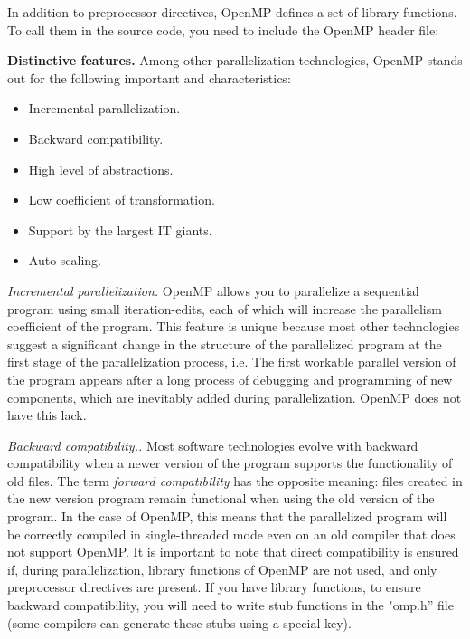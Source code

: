 {\begin{table}[H]
	\end{table}
	\par In addition to preprocessor directives, OpenMP defines a set of library functions. To call them in the source code, you need to include the OpenMP header file:
	\begin{figure}[H]
		
	\end{figure}
	\par\textbf{Distinctive features.} Among other parallelization technologies, OpenMP stands out for the following important and characteristics:
	\begin{itemize}
		\item Incremental parallelization.
		\item Backward compatibility.
		\item High level of abstractions.
		\item Low coefficient of transformation.
		\item Support by the largest IT giants.
		\item Auto scaling.
	\end{itemize}
	\par\textit{Incremental parallelization.} OpenMP allows you to parallelize a sequential program using small iteration-edits, each of which will increase the parallelism coefficient of the program. This feature is unique because most other technologies suggest a significant change in the structure of the parallelized program at the first stage of the parallelization process, i.e. The first workable parallel version of the program appears after a long process of debugging and programming of new components, which are inevitably added during parallelization. OpenMP does not have this lack.
	\par\textit{Backward compatibility..} Most software technologies evolve with backward compatibility when a newer version of the program supports the functionality of old files. The term \textit{forward compatibility} has the opposite meaning: files created in the new version program remain functional when using the old version of the program. In the case of OpenMP, this means that the parallelized program will be correctly compiled in single-threaded mode even on an old compiler that does not support OpenMP. It is important to note that direct compatibility is ensured if, during parallelization, library functions of OpenMP are not used, and only preprocessor directives are present. If you have library functions, to ensure backward compatibility, you will need to write stub functions in the "omp.h'' file (some compilers can generate these stubs using a special key).
}
